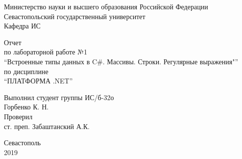 \documentclass[a4paper,14pt]{extarticle}
\newcommand{\mylabnumber}{1}
\newcommand{\mylabtitle}{Встроенные типы данных в C\#. Массивы. Строки. Регулярные выражения}
\newcommand{\mysubject}{Платформа .NET}
\newcommand{\mylecturer}{ст. преп. Забаштанский А.К.}
\begin{document}
    \lstset{ %
        basicstyle=\footnotesize\ttfamily,
        breaklines=true,
        numbersep=5pt,
        tabsize=4,
        gobble=8,
        extendedchars=\true,
        keepspaces=\true,
        numbers=left,
        stringstyle=\ttfamily,
        showstringspaces=\false
    }


    \begin{titlepage}
        
        \thispagestyle{empty}
        
        \begin{center}
            
            Министерство науки и высшего образования Российской Федерации \\
            Севастопольский государственный университет \\
            Кафедра ИС
            
            \vfill

            Отчет \\
            по лабораторной работе №\mylabnumber \\
            \enquote{\mylabtitle"} \\
            по дисциплине \\
            \enquote{\MakeTextUppercase{\mysubject}}

        \end{center}

        \vspace{1cm}

        \noindent\hspace{7.5cm} Выполнил студент группы ИС/б-32о \\
        \null\hspace{7.5cm} Горбенко К. Н. \\
        \null\hspace{7.5cm} Проверил \\
        \null\hspace{7.5cm} \mylecturer

        \vfill

        \begin{center}
            Севастополь \\
            2019
        \end{center}

    \end{titlepage}
\end{document}
